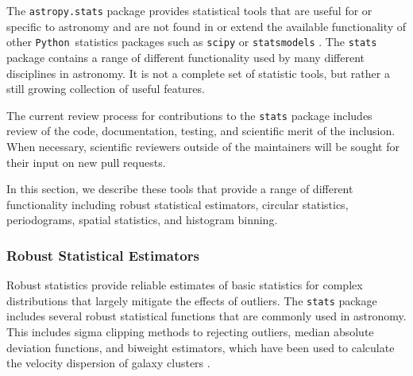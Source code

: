 \documentclass[modern]{aastex61}
\newcommand{\package}[1]{\texttt{#1}\xspace}
\newcommand{\python}{\package{Python}\xspace}
\begin{document}
The \package{astropy.stats} package provides statistical tools that
are useful for or specific to astronomy and are not found in or extend
the available functionality of other \python\ statistics packages such
as \package{scipy} \citep{scipy} or \package{statsmodels}
\citep{seabold2010statsmodels}.  The \package{stats} package contains
a range of different functionality used by many different disciplines
in astronomy.  It is not a complete set of statistic tools, but rather
a still growing collection of useful features.

The current review process for contributions to the \package{stats} package includes review of the code, documentation, testing, and scientific merit of the inclusion.  When necessary, scientific reviewers outside of the maintainers will be sought for their input on new pull requests.

In this section, we describe these tools that provide a range of different functionality including robust statistical estimators, circular statistics, periodograms, spatial statistics, and histogram binning.



\subsubsection{Robust Statistical Estimators}

Robust statistics provide reliable estimates of basic statistics for complex distributions that largely mitigate the effects of outliers. The \package{stats} package includes several robust statistical functions that are commonly used in astronomy. This includes sigma clipping methods to rejecting outliers, median absolute deviation functions, and biweight estimators, which have been used to calculate the velocity dispersion of galaxy clusters \citep{Beers1990}.
\end{document}

